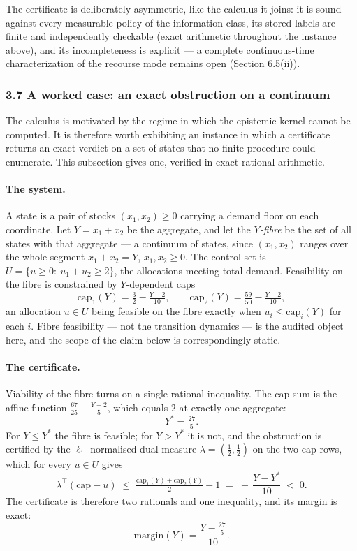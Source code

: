 \documentclass[10pt,twocolumn]{article}
\theoremstyle{definition}
\begin{document}
The certificate is deliberately asymmetric, like the calculus it joins: it is
sound against every measurable policy of the information class, its stored
labels are finite and independently checkable (exact arithmetic throughout the
instance above), and its incompleteness is explicit --- a complete
continuous-time characterization of the recourse mode remains open
(Section 6.5(ii)).

\subsubsection{3.7 A worked case: an exact obstruction on a continuum}
\label{calc-worked-case}

The calculus is motivated by the regime in which the epistemic kernel cannot be computed.
It is therefore worth exhibiting an instance in which a certificate returns an exact verdict
on a set of states that no finite procedure could enumerate. This subsection gives one,
verified in exact rational arithmetic.

\paragraph{The system.} A state is a pair of stocks \((x_1,x_2)\ge 0\) carrying a demand
floor on each coordinate. Let \(Y=x_1+x_2\) be the aggregate, and let the \emph{\(Y\)-fibre}
be the set of all states with that aggregate --- a continuum of states, since
\((x_1,x_2)\) ranges over the whole segment \(x_1+x_2=Y\), \(x_1,x_2\ge 0\). The control set
is \(U=\{u\ge 0:\ u_1+u_2\ge 2\}\), the allocations meeting total demand. Feasibility on the
fibre is constrained by \(Y\)-dependent caps
\[
\mathrm{cap}_1(Y)=\tfrac32-\tfrac{Y-2}{10},\qquad
\mathrm{cap}_2(Y)=\tfrac{59}{50}-\tfrac{Y-2}{10},
\]
an allocation \(u\in U\) being feasible on the fibre exactly when \(u_i\le\mathrm{cap}_i(Y)\)
for each \(i\). Fibre feasibility --- not the transition dynamics --- is the audited object
here, and the scope of the claim below is correspondingly static.

\paragraph{The certificate.} Viability of the fibre turns on a single rational inequality.
The cap sum is the affine function \(\tfrac{67}{25}-\tfrac{Y-2}{5}\), which equals \(2\) at
exactly one aggregate:
\[
Y^{*}=\tfrac{27}{5}.
\]
For \(Y\le Y^{*}\) the fibre is feasible; for \(Y>Y^{*}\) it is not, and the obstruction is
certified by the \(\ell_1\)-normalised dual measure \(\lambda=(\tfrac12,\tfrac12)\) on the two
cap rows, which for every \(u\in U\) gives
\[
\lambda^{\top}(\mathrm{cap}-u)\;\le\;\tfrac{\mathrm{cap}_1(Y)+\mathrm{cap}_2(Y)}{2}-1
\;=\;-\,\frac{Y-Y^{*}}{10}\;<\;0 .
\]
The certificate is therefore two rationals and one inequality, and its margin is exact:
\[
\mathrm{margin}(Y)=\frac{Y-\tfrac{27}{5}}{10}.
\]
\end{document}
